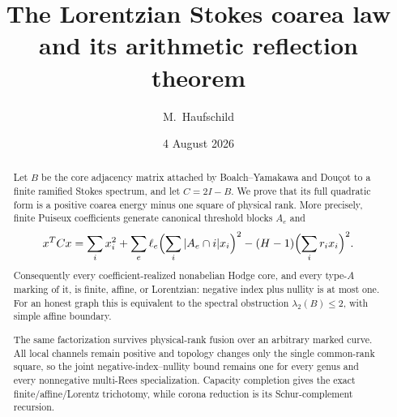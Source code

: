 \documentclass[11pt,a4paper]{amsart}
\theoremstyle{plain}
\theoremstyle{definition}
\begin{document}
\title[The Lorentzian Stokes coarea law]{The Lorentzian Stokes coarea law and its arithmetic reflection theorem}
\author{M.~Haufschild}
\address{Independent researcher}
\date{4 August 2026}

\begin{abstract}
Let $B$ be the core adjacency matrix attached by Boalch--Yamakawa and Dou\c{c}ot to a finite
ramified Stokes spectrum, and let $C=2I-B$.  We prove that its full quadratic form is a positive
coarea energy minus one square of physical rank.  More precisely, finite Puiseux coefficients
generate canonical threshold blocks $A_e$ and
\[
 x^TCx=\sum_i x_i^2+\sum_e\ell_e\Bigl(\sum_i|A_e\cap i|x_i\Bigr)^2
              -(H-1)\Bigl(\sum_i r_ix_i\Bigr)^2.
\]
Consequently every coefficient-realized nonabelian Hodge core, and every type-$A$ marking of it,
is finite, affine, or Lorentzian: negative index plus nullity is at most one.  For an honest graph
this is equivalent to the spectral obstruction $\lambda_2(B)\leq2$, with simple affine boundary.

The same factorization survives physical-rank fusion over an arbitrary marked curve.  All local
channels remain positive and topology changes only the single common-rank square, so the joint
negative-index--nullity bound remains one for every genus and every nonnegative multi-Rees
specialization.  Capacity completion gives the exact finite/affine/Lorentz trichotomy, while
corona reduction is its Schur-complement recursion.


\end{abstract}
\end{document}

